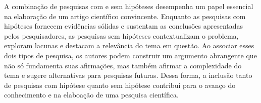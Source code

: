 A combinação de pesquisas com e sem hipóteses desempenha um papel essencial na elaboração de um artigo científico convincente. Enquanto as pesquisas com hipóteses fornecem evidências sólidas e sustentam as conclusões apresentadas pelos pesquisadores, as pesquisas sem hipóteses contextualizam o problema, exploram lacunas e destacam a relevância do tema em questão. Ao associar esses dois tipos de pesquisa, os autores podem construir um argumento abrangente que não só fundamenta suas afirmações, mas também afirmar a complexidade do tema e sugere alternativas para pesquisas futuras. Dessa forma, a inclusão tanto de pesquisas com hipótese quanto sem hipótese contribui para o avanço do conhecimento e na elaboação de uma pesquisa científica.


% 
